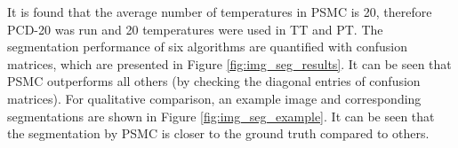 It is found that the average number of temperatures in PSMC is 20, therefore PCD-20 was run and 20 temperatures were used in TT and PT. The segmentation performance of 
six algorithms are quantified with confusion matrices, which are presented in Figure \ref{fig:img_seg_results}. It can be seen that PSMC outperforms all others (by checking the diagonal 
entries of confusion matrices).      
For qualitative comparison, an example image and corresponding segmentations are shown in Figure \ref{fig:img_seg_example}.  It can be seen that the segmentation by PSMC is closer to the ground truth 
compared to others. 
\begin{figure}[t!] 
    \centering

\end{figure}
